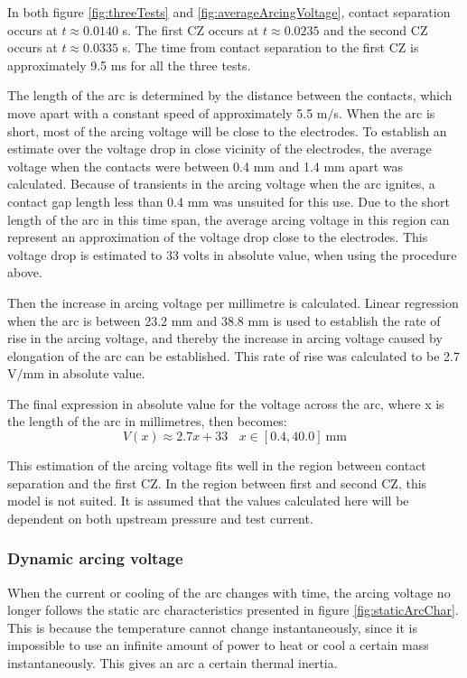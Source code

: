 \documentclass[10pt,b5paper,twoside]{article}
\begin{document}
In both figure \ref{fig:threeTests} and \ref{fig:averageArcingVoltage}, contact separation occurs at $t \approx 0.0140$ s. The first CZ occurs at $t \approx 0.0235$ and the second CZ occurs at $t \approx 0.0335$ s. The time from contact separation to the first CZ is approximately 9.5 ms for all the three tests.

The length of the arc is determined by the distance between the contacts, which move apart with a constant speed of approximately 5.5 m$/$s. When the arc is short, most of the arcing voltage will be close to the electrodes. To establish an estimate over the voltage drop in close vicinity of the electrodes, the average voltage when the contacts were between 0.4 mm and 1.4 mm apart was calculated. Because of transients in the arcing voltage when the arc ignites, a contact gap length less than 0.4 mm was unsuited for this use. Due to the short length of the arc in this time span, the average arcing voltage in this region can represent an approximation of the voltage drop close to the electrodes. This voltage drop is estimated to 33 volts in absolute value, when using the procedure above.

Then the increase in arcing voltage per millimetre is calculated. Linear regression when the arc is between 23.2 mm and 38.8 mm is used to establish the rate of rise in the arcing voltage, and thereby the increase in arcing voltage caused by elongation of the arc can be established. This rate of rise was calculated to be 2.7 V$/$mm in absolute value.

The final expression in absolute value for the voltage across the arc, where x is the length of the arc in millimetres, then becomes:
\begin{equation}
V(x) \approx 2.7x+33 \ \ \ \ x \in [0.4, 40.0] \ \mathrm{mm}
\end{equation}

This estimation of the arcing voltage fits well in the region between contact separation and the first CZ. In the region between first and second CZ, this model is not suited. It is assumed that the values calculated here will be dependent on both upstream pressure and test current.


\subsubsection{Dynamic arcing voltage} \label{sec:dynARC}
When the current or cooling of the arc changes with time, the arcing voltage no longer follows the static arc characteristics presented in figure \ref{fig:staticArcChar}. This is because the temperature cannot change instantaneously, since it is impossible to use an infinite amount of power to heat or cool a certain mass instantaneously. This gives an arc a certain thermal inertia.
\end{document}

